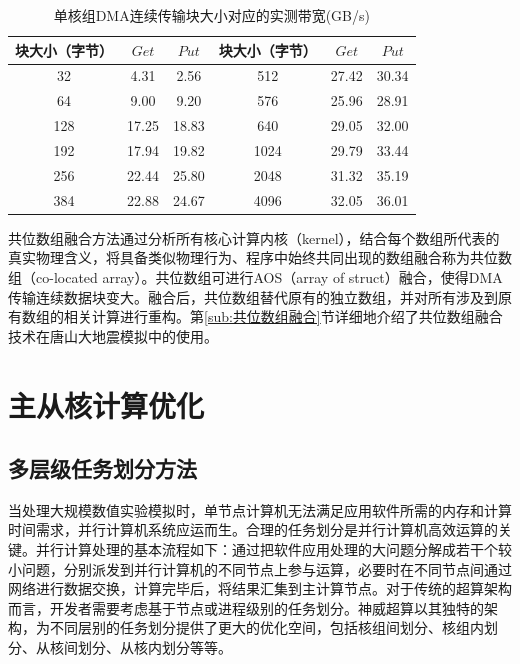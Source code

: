 \documentclass[degree=doctor]{thuthesis}
\begin{document}
\begin{table}[thb]
\caption{单核组DMA连续传输块大小对应的实测带宽(GB/s)}
\label{tb:sw-bw}
\centering
\begin{tabular}{|c|c|c||c|c|c|}
  \hline
  块大小（字节） & $Get$ & $Put$ & 块大小（字节） & $Get$ & $Put$ \\
  \hline
  32&4.31&2.56& 512&27.42&30.34\\
  \hline
  64&9.00&9.20& 576&25.96&28.91\\
  \hline
  128&17.25&18.83& 640&29.05&32.00\\
  \hline
  192&17.94&19.82& 1024&29.79&33.44\\
  \hline
  256&22.44&25.80& 2048&31.32&35.19\\
  \hline
  384&22.88&24.67& 4096&32.05&36.01\\
  \hline
\end{tabular}
\end{table}

共位数组融合方法通过分析所有核心计算内核（kernel），结合每个数组所代表的真实物理含义，将具备类似物理行为、程序中始终共同出现的数组融合称为共位数组（co-located array）。共位数组可进行AOS（array of struct）融合，使得DMA传输连续数据块变大。融合后，共位数组替代原有的独立数组，并对所有涉及到原有数组的相关计算进行重构。第\ref{sub:共位数组融合}节详细地介绍了共位数组融合技术在唐山大地震模拟中的使用。


\section{主从核计算优化}

\subsection{多层级任务划分方法}

当处理大规模数值实验模拟时，单节点计算机无法满足应用软件所需的内存和计算时间需求，并行计算机系统应运而生。合理的任务划分是并行计算机高效运算的关键。并行计算处理的基本流程如下：通过把软件应用处理的大问题分解成若干个较小问题，分别派发到并行计算机的不同节点上参与运算，必要时在不同节点间通过网络进行数据交换，计算完毕后，将结果汇集到主计算节点。对于传统的超算架构而言，开发者需要考虑基于节点或进程级别的任务划分。神威超算以其独特的架构，为不同层别的任务划分提供了更大的优化空间，包括核组间划分、核组内划分、从核间划分、从核内划分等等。
\end{document}
